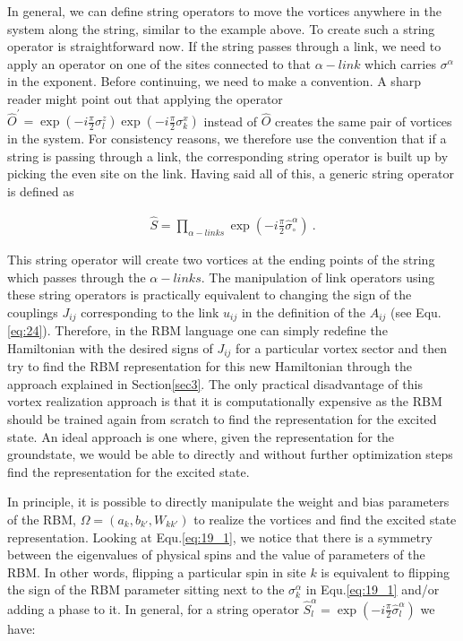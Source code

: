\documentclass{article}
\begin{document}
In general, we can define string operators to move the vortices anywhere in the system along the string, similar to the example above. To create such a string operator is straightforward now. If the string passes through a link, we need to apply an operator on one of the sites connected to that $\alpha-link$ which carries $\sigma^\alpha$ in the exponent. Before continuing, we need to make a convention. A sharp reader might point out that applying the operator $\hat{O}^{'} = \exp{(-i\frac{\pi}{2}\sigma^z_l)} \exp{(-i\frac{\pi}{2}\sigma^x_k)}$ instead of $\hat{O}$ creates the same pair of vortices in the system. For consistency reasons, we therefore use the convention that if a string is passing through a link, the corresponding string operator is built up by picking the even site on the link. Having said all of this,  a generic string operator is defined as

\begin{equation}\label{eq:29}
	\begin{aligned}
		\hat{S} = \prod_{\alpha-links} \exp{(-i\frac{\pi}{2}\hat{\sigma}^\alpha_\circ)}~.
		\end{aligned}
\end{equation}

This string operator will create two vortices at the ending points of the string which passes through the $\alpha-links$. The manipulation of link operators using these string operators is practically equivalent to changing the sign of the couplings $J_{ij}$ corresponding to the link $u_{ij}$ in the definition of the $A_{ij}$ (see Equ.\hspace{0.2mm}\ref{eq:24}). Therefore, in the RBM language one can simply redefine the Hamiltonian with the desired signs of $J_{ij}$ for a particular vortex sector and then try to find the RBM representation for this new Hamiltonian through the approach explained in Section\hspace{0.2mm}\ref{sec3}. The only practical disadvantage of this vortex realization approach is that it is computationally expensive as the RBM should be trained again from scratch to find the representation for the excited state. An ideal approach is one where, given the representation for the groundstate, we would be able to directly and without further optimization steps find the representation for the excited state. 

In principle, it is possible to directly manipulate the weight and bias parameters of the RBM,  $\Omega=(a_{k},b_{k'},W_{kk'})$ to realize the vortices and find the excited state representation. Looking at Equ.\hspace{0.2mm}\ref{eq:19_1}, we notice that there is a symmetry between the eigenvalues of physical spins and the value of parameters of the RBM. In other words, flipping a particular spin in site $k$ is equivalent to flipping the sign of the RBM parameter sitting next to the $\sigma^{\alpha}_k$ in Equ.\hspace{0.2mm}\ref{eq:19_1} and/or adding a phase to it. In general, for a string operator $\hat{S}_l^{\alpha} = \exp{(-i\frac{\pi}{2}\hat{\sigma}^{\alpha}_l)}$ we have:
\end{document}
